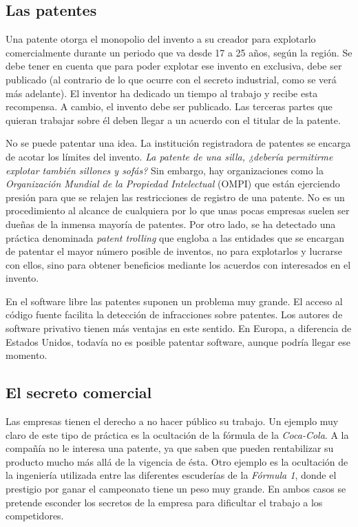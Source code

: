 \subsection{Las patentes}
Una patente otorga el monopolio del invento a su creador para explotarlo
comercialmente durante un periodo que va desde 17 a 25 años, según la región.
Se debe tener en cuenta que para poder explotar ese invento en exclusiva, debe
ser publicado (al contrario de lo que ocurre con el secreto industrial, como se
verá más adelante). El inventor ha dedicado un tiempo al trabajo y recibe esta
recompensa. A cambio, el invento debe ser publicado. Las terceras partes que
quieran trabajar sobre él deben llegar a un acuerdo con el titular de la
patente.

No se puede patentar una idea. La institución registradora de patentes
se encarga de acotar los límites del invento. \emph{La patente de una
  silla, ¿debería permitirme explotar también sillones y sofás?} Sin
embargo, hay organizaciones como la \emph{Organización Mundial de la
  Propiedad Intelectual} (OMPI) que están ejerciendo presión para que
se relajen las restricciones de registro de una patente. No es un
procedimiento al alcance de cualquiera por lo que unas pocas empresas
suelen ser dueñas de la inmensa mayoría de patentes. Por otro lado, se
ha detectado una práctica denominada \emph{patent trolling} que
engloba a las entidades que se encargan de patentar el mayor número
posible de inventos, no para explotarlos y lucrarse con ellos, sino
para obtener beneficios mediante los acuerdos con interesados en el
invento.

En el software libre las patentes suponen un problema muy grande. El
acceso al código fuente facilita la detección de infracciones sobre
patentes. Los autores de software privativo tienen más ventajas en
este sentido. En Europa, a diferencia de Estados Unidos, todavía no es
posible patentar software, aunque podría llegar ese momento.

\subsection{El secreto comercial}
Las empresas tienen el derecho a no hacer público su trabajo. Un
ejemplo muy claro de este tipo de práctica es la ocultación de la
fórmula de la \emph{Coca-Cola}. A la compañía no le interesa una
patente, ya que saben que pueden rentabilizar su producto mucho más
allá de la vigencia de ésta. Otro ejemplo es la ocultación de la
ingeniería utilizada entre las diferentes escuderías de la
\emph{Fórmula 1}, donde el prestigio por ganar el campeonato tiene un
peso muy grande. En ambos casos se pretende esconder los secretos de
la empresa para dificultar el trabajo a los competidores.

